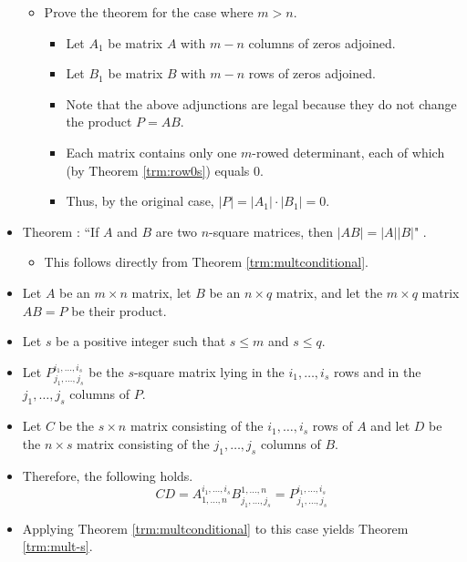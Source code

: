 \documentclass[titlepage]{article}
\newcounter{theorem}
\newcommand{\newtrm}[1]{\refstepcounter{theorem}\label{#1}Theorem \thetheorem: }
\numberwithin{figure}{section}
\numberwithin{equation}{section}
\numberwithin{theorem}{section}
\newcommand{\dq}[4][]{``#2"#1 \cite[#4]{#3}.}
\begin{document}
\begin{itemize}
\begin{itemize}
\begin{itemize}
        \end{itemize}
        \item Prove the theorem for the case where $m>n$.
        \begin{itemize}
            \item Let $A_1$ be matrix $A$ with $m-n$ columns of zeros adjoined.
            \item Let $B_1$ be matrix $B$ with $m-n$ rows of zeros adjoined.
            \item Note that the above adjunctions are legal because they do not change the product $P=AB$.
            \item Each matrix contains only one $m$-rowed determinant, each of which (by Theorem \ref{trm:row0s}) equals 0.
            \item Thus, by the original case, $|P|=|A_1|\cdot|B_1|=0$.
        \end{itemize}
    \end{itemize}
    \item \newtrm{trm:mult}\dq{If $A$ and $B$ are two $n$-square matrices, then $|AB|=|A||B|$}{bib:determinants}{25}
    \begin{itemize}
        \item This follows directly from Theorem \ref{trm:multconditional}.
    \end{itemize}
    \item Let $A$ be an $m\times n$ matrix, let $B$ be an $n\times q$ matrix, and let the $m\times q$ matrix $AB=P$ be their product.
    \item Let $s$ be a positive integer such that $s\leq m$ and $s\leq q$.
    \item Let $P_{j_1,\dots,j_s}^{i_1,\dots,i_s}$ be the $s$-square matrix lying in the $i_1,\dots,i_s$ rows and in the $j_1,\dots,j_s$ columns of $P$.
    \item Let $C$ be the $s\times n$ matrix consisting of the $i_1,\dots,i_s$ rows of $A$ and let $D$ be the $n\times s$ matrix consisting of the $j_1,\dots,j_s$ columns of $B$.
    \item Therefore, the following holds.
    \begin{equation*}
        CD = A_{1,\dots,n}^{i_1,\dots,i_s}B_{j_1,\dots,j_s}^{1,\dots,n} = P_{j_1,\dots,j_s}^{i_1,\dots,i_s}
    \end{equation*}
    \item Applying Theorem \ref{trm:multconditional} to this case yields Theorem \ref{trm:mult-s}.

\end{itemize}
\end{document}
